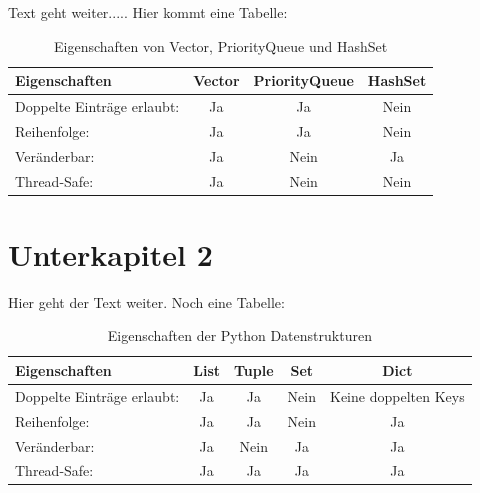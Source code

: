 \documentclass[fontsize=12pt,paper=a4,open=any,parskip=half,
  twoside=false,toc=listof,toc=bibliography,fleqn,leqno,
  captions=nooneline,captions=tableabove,british]{scrbook}
\begin{document}
Text geht weiter..... Hier kommt eine Tabelle:

\begin{table}[htbp]
\caption{Eigenschaften von Vector, PriorityQueue und HashSet}
\label{data-table}
\centering
  \begin{tabular}{l  c  c  c} 
\toprule
    Eigenschaften & Vector & PriorityQueue & HashSet\\ 
\midrule  
    Doppelte Einträge erlaubt:   		& Ja  	&  Ja  	& Nein \\
    Reihenfolge:   						& Ja 	&  Ja 		& Nein \\ 
	Veränderbar:   						& Ja	&  Nein 	& Ja \\ 
	Thread-Safe:   						& Ja 	& Nein 	& Nein\\ 
  \end{tabular}

\end{table}


\section{Unterkapitel 2}\label{ch:vector}
Hier geht der Text weiter. Noch eine Tabelle:

\begin{table}[htbp]
\caption{Eigenschaften der Python Datenstrukturen \autocite{listuple}}
\label{python-data-table}
\centering
  \begin{tabular}{l  c  c  c c} 
\toprule
    Eigenschaften & List & Tuple & Set & Dict\\ 
\midrule  
    	Doppelte Einträge erlaubt:   			& Ja  	&  Ja  		& Nein 	& Keine doppelten Keys\\
    	Reihenfolge:   						& Ja 	&  Ja 		& Nein 	& Ja\\ 
	Veränderbar:   						& Ja	&  Nein 	& Ja 		& Ja\\ 
	Thread-Safe:   						& Ja 	& Ja 	& Ja 		& Ja\\ 
  \end{tabular}

\end{table}





\printbibliography[title=Literaturverzeichnis]
\end{document}
